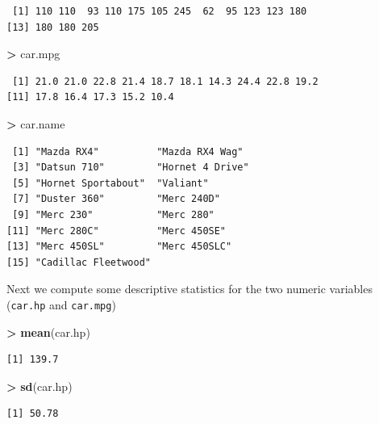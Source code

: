 \documentclass[]{krantz}
\makeatletter
\newenvironment{Shaded}{\begin{snugshade}}{\end{snugshade}}
\newcommand{\KeywordTok}[1]{\textcolor[rgb]{0.27,0.27,0.27}{\textbf{#1}}}
\newcommand{\StringTok}[1]{\textcolor[rgb]{0.5,0.5,0.5}{#1}}
\newcommand{\OperatorTok}[1]{\textcolor[rgb]{0.43,0.43,0.43}{\textbf{#1}}}
\newcommand{\NormalTok}[1]{#1}
\newenvironment{kframe}{%
\medskip{}
\setlength{\fboxsep}{.8em}
 \def\at@end@of@kframe{}%
 \ifinner\ifhmode%
  \def\at@end@of@kframe{\end{minipage}}%
  \begin{minipage}{\columnwidth}%
 \fi\fi%
 \def\FrameCommand##1{\hskip\@totalleftmargin \hskip-\fboxsep
 \colorbox{shadecolor}{##1}\hskip-\fboxsep
     \hskip-\linewidth \hskip-\@totalleftmargin \hskip\columnwidth}%
 \MakeFramed {\advance\hsize-\width
   \@totalleftmargin\z@ \linewidth\hsize
   \@setminipage}}%
 {\par\unskip\endMakeFramed%
 \at@end@of@kframe}
\renewenvironment{Shaded}{\begin{kframe}}{\end{kframe}}
\makeatother
\begin{document}
\begin{verbatim}
 [1] 110 110  93 110 175 105 245  62  95 123 123 180
[13] 180 180 205
\end{verbatim}

\begin{Shaded}
\begin{Highlighting}[]
\OperatorTok{>}\StringTok{ }\NormalTok{car.mpg}
\end{Highlighting}
\end{Shaded}

\begin{verbatim}
 [1] 21.0 21.0 22.8 21.4 18.7 18.1 14.3 24.4 22.8 19.2
[11] 17.8 16.4 17.3 15.2 10.4
\end{verbatim}

\begin{Shaded}
\begin{Highlighting}[]
\OperatorTok{>}\StringTok{ }\NormalTok{car.name}
\end{Highlighting}
\end{Shaded}

\begin{verbatim}
 [1] "Mazda RX4"          "Mazda RX4 Wag"     
 [3] "Datsun 710"         "Hornet 4 Drive"    
 [5] "Hornet Sportabout"  "Valiant"           
 [7] "Duster 360"         "Merc 240D"         
 [9] "Merc 230"           "Merc 280"          
[11] "Merc 280C"          "Merc 450SE"        
[13] "Merc 450SL"         "Merc 450SLC"       
[15] "Cadillac Fleetwood"
\end{verbatim}

Next we compute some descriptive statistics for the two numeric
variables (\texttt{car.hp} and \texttt{car.mpg})

\begin{Shaded}
\begin{Highlighting}[]
\OperatorTok{>}\StringTok{ }\KeywordTok{mean}\NormalTok{(car.hp)}
\end{Highlighting}
\end{Shaded}

\begin{verbatim}
[1] 139.7
\end{verbatim}

\begin{Shaded}
\begin{Highlighting}[]
\OperatorTok{>}\StringTok{ }\KeywordTok{sd}\NormalTok{(car.hp)}
\end{Highlighting}
\end{Shaded}

\begin{verbatim}
[1] 50.78
\end{verbatim}
\end{document}
